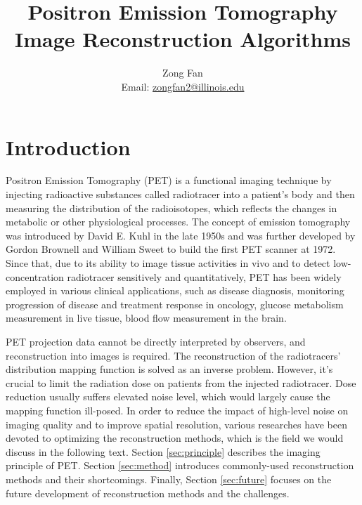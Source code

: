 \documentclass[11pt,a4paper]{article}
\title{\vspace{-1.4cm}\Large Positron Emission Tomography Image Reconstruction Algorithms}
\date{}
\author{Zong Fan \\Email: \href{mailto:zongfan2@illinois.edu}{zongfan2@illinois.edu}}
\begin{document}
    \maketitle
    \vspace{-1.2cm}
    \section{Introduction}
    Positron Emission Tomography (PET) is a functional imaging technique by injecting radioactive substances called radiotracer into a patient's body and then measuring the distribution of the radioisotopes, which reflects the changes in metabolic or other physiological processes. The concept of emission tomography was introduced by David E. Kuhl in the late 1950s and was further developed by Gordon Brownell and William Sweet to build the first PET scanner at 1972\cite{portnow2013history}. Since that, due to its ability to image tissue activities in vivo and to detect low-concentration radiotracer sensitively and quantitatively, PET has been widely employed in various clinical applications, such as disease diagnosis, monitoring progression of disease and treatment response in oncology, glucose metabolism measurement in live tissue, blood flow measurement in the brain. 

    PET projection data cannot be directly interpreted by observers, and reconstruction into images is required. The reconstruction of the radiotracers' distribution mapping function is solved as an inverse problem. However, it's crucial to limit the radiation dose on patients from the injected radiotracer. Dose reduction usually suffers elevated noise level, which would largely cause the mapping function ill-posed. In order to reduce the impact of high-level noise on imaging quality and to improve spatial resolution, various researches have been devoted to optimizing the reconstruction methods\cite{tong2010petctreview}, which is the field we would discuss in the following text. Section \ref{sec:principle} describes the imaging principle of PET. Section \ref{sec:method} introduces commonly-used reconstruction methods and their shortcomings. Finally, Section \ref{sec:future} focuses on the future development of reconstruction methods and the challenges.

    \vspace{-0.5cm}
\end{document}
